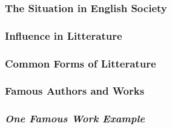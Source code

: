 \subsubsection{The Situation in English Society}

\subsubsection{Influence in Litterature}

\subsubsection{Common Forms of Litterature}

\subsubsection{Famous Authors and Works}

\subsubsection{\textit{One Famous Work Example}}









